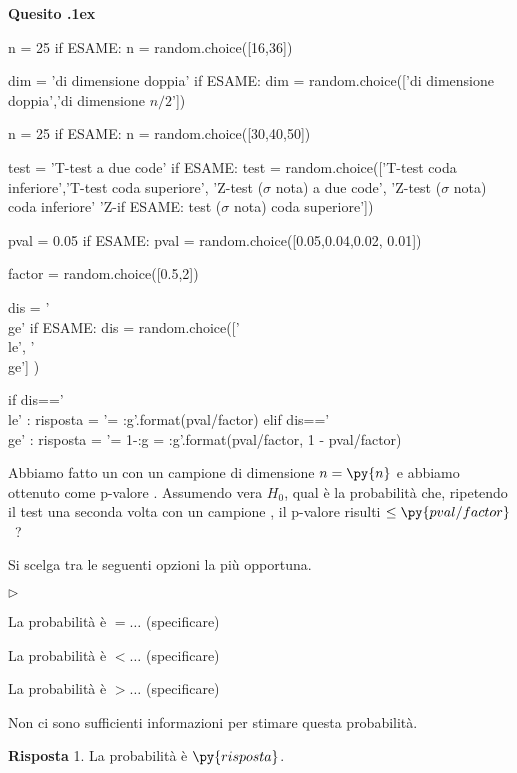 \documentclass[11pt,twoside,a4paper]{article}
\newcommand{\mylabel}[1]{#1\hfill}
\renewenvironment{itemize}
  {\begin{list}{$\triangleright$}{%
   \setlength{\parskip}{0mm}
   \setlength{\topsep}{.4\baselineskip}
   \setlength{\rightmargin}{0mm}
   \setlength{\listparindent}{0mm}
   \setlength{\itemindent}{0mm}
   \setlength{\labelwidth}{2ex}
   \setlength{\itemsep}{.4\baselineskip}
   \setlength{\parsep}{0mm}
   \setlength{\partopsep}{0mm}
   \setlength{\labelsep}{1ex}
   \setlength{\leftmargin}{\labelwidth+\labelsep}
   \let\makelabel\mylabel}}{%
   \end{list}\vspace*{-1.3mm}}
\newcounter{quesito}
\newenvironment{question}{\bigskip\addtocounter{quesito}{1}\par\textbf{Quesito \thequesito.\kern1ex}}{\vspace{\parskip}}
\newenvironment{answer}{\par\textbf{Risposta\quad}}{\vspace{\parskip}}
\begin{document}
\begin{question} %
\begin{pycode}
n = 25
if ESAME: n = random.choice([16,36])

dim = 'di dimensione doppia'
if ESAME: dim  = random.choice(['di dimensione doppia','di dimensione $n/2$'])

n = 25
if ESAME: n = random.choice([30,40,50])

test = 'T-test a due code'
if ESAME: test = random.choice(['T-test coda inferiore','T-test coda superiore', 'Z-test ($\sigma$ nota) a due code', 'Z-test ($\sigma$ nota) coda inferiore' 'Z-if ESAME: test ($\sigma$ nota) coda superiore'])

pval = 0.05
if ESAME: pval = random.choice([0.05,0.04,0.02, 0.01])

factor =  random.choice([0.5,2])

dis = '\\ge'
if ESAME: dis = random.choice(['\\le', '\\ge'] )

if   dis=='\\le' : risposta = '= {:g}'.format(pval/factor)
elif dis=='\\ge' : risposta = '= 1-{:g} = {:g}'.format(pval/factor, 1 - pval/factor)
\end{pycode}
Abbiamo fatto un  con un campione di dimensione $n=\py{n}$ e abbiamo ottenuto come p-valore .
Assumendo vera $H_0$, qual è la probabilità che, ripetendo il test una seconda volta con un campione , il p-valore risulti $\le\py{pval/factor}$~?

Si scelga tra le seguenti opzioni la più opportuna.
\begin{itemize}
\item[1.] La probabilità è $=\dots$ (specificare)
\item[2.] La probabilità è $<\dots$ (specificare)
\item[3.] La probabilità è $>\dots$ (specificare)
\item[4.] Non ci sono sufficienti informazioni per stimare questa probabilità.
\end{itemize}
\begin{answer}
{\color{blue}1. La probabilità è $\py{risposta}$.}
\end{answer}
\end{question}
\end{document}
